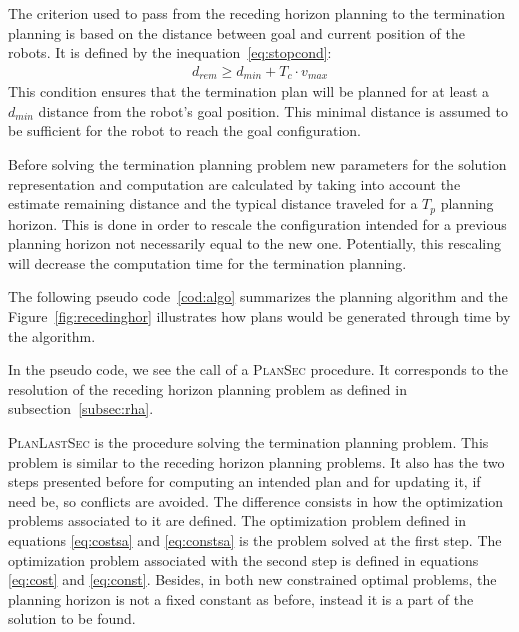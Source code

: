 The criterion used to pass from the receding 
horizon planning to the termination planning is based on the distance between
goal and current position of the robots. It is defined by the inequation~\ref{eq:stopcond}:
\begin{align}\label{eq:stopcond}
  d_{rem} \geq d_{min} + T_c \cdot v_{max}
\end{align}
This condition ensures that the termination plan will be planned for at least a 
$d_{min}$ distance from the robot's goal position.
This minimal distance is assumed to be sufficient for the robot to reach the 
goal configuration.

Before solving the termination planning problem new parameters for 
the solution representation and computation are calculated by taking into
account the estimate remaining distance and the typical distance traveled
for a $T_p$ planning horizon.
This is done in order to rescale the configuration intended for a previous 
planning horizon not necessarily equal to the new one. Potentially, this
rescaling will decrease the computation time for the termination planning.

The following pseudo code~\ref{cod:algo} summarizes the planning algorithm    
and the Figure~\ref{fig:recedinghor} illustrates how plans would be generated
through time by the algorithm.

In the pseudo code, we see the call of a {\scshape PlanSec} procedure.
It corresponds to the resolution of the receding horizon planning 
problem as defined in subsection~\ref{subsec:rha}.

{\scshape PlanLastSec} is the procedure solving the termination planning
problem. This problem is similar to the receding horizon planning problems.
It also has the two steps presented before for computing an intended plan and
for updating it, if need be, so conflicts are avoided.
The difference consists in how the optimization problems associated to it are 
defined. The optimization problem defined in equations \ref{eq:costsa} and
\ref{eq:constsa} is the problem solved at the first step.
The optimization
problem associated with the second step is defined in equations 
\ref{eq:cost} and \ref{eq:const}.
Besides, in both new constrained optimal problems, the planning horizon is not
a fixed constant as before, instead it is a part of the solution to be found.

